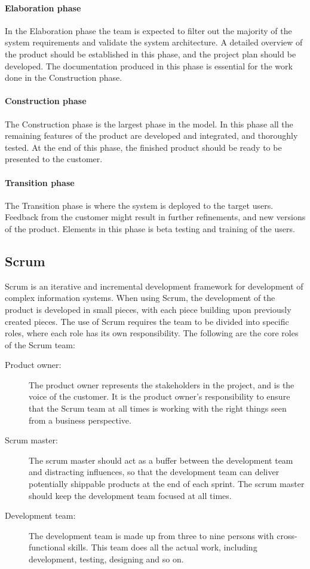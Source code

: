 \paragraph{Elaboration phase} In the Elaboration phase the team is expected to filter out the majority of the system requirements and validate the system architecture. A detailed overview of the product should be established in this phase, and the project plan should be developed. The documentation produced in this phase is essential for the work done in the Construction phase.

\paragraph{Construction phase} The Construction phase is the largest phase in the model. In this phase all the remaining features of the product are developed and integrated, and thoroughly tested. At the end of this phase, the finished product should be ready to be presented to the customer.

\paragraph{Transition phase} The Transition phase is where the system is deployed to the target users. Feedback from the customer might result in further refinements, and new versions of the product. Elements in this phase is beta testing and training of the users.

\subsection{Scrum}
Scrum is an iterative and incremental development framework for development of complex information systems. When using Scrum, the development of the product is developed in small pieces, with each piece building upon previously created pieces. The use of Scrum requires the team to be divided into specific roles, where each role has its own responsibility. The following are the core roles of the Scrum team\cite{scrum}\cite{sommerville}:
\begin{description}
	\item[Product owner:]{The product owner represents the stakeholders in the project, and is the voice of the customer. It is the product owner's responsibility to ensure that the Scrum team at all times is working with the right things seen from a business perspective.}
	\item[Scrum master:]{The scrum master should act as a buffer between the development team and distracting influences, so that the development team can deliver potentially shippable products at the end of each sprint. The scrum master should keep the development team focused at all times.}
	\item[Development team:]{The development team is made up from three to nine persons with cross-functional skills. This team does all the actual work, including development, testing, designing and so on.}
\end{description}

